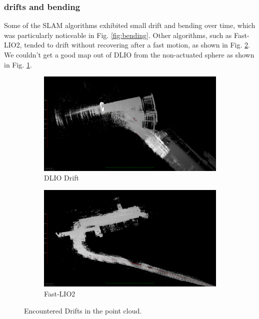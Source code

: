 \documentclass[conference]{IEEEtran}
\begin{document}
\subsubsection{drifts and bending}
Some of the SLAM algorithms exhibited small drift and bending over time, which was particularly noticeable in Fig. \ref{fig:bending}. Other algorithms, such as Fast-LIO2, tended to drift without recovering after a fast motion, as shown in Fig. \ref{fig:lio_drift}. We couldn't get a good map out of DLIO from the non-actuated sphere as shown in Fig. \ref{fig:dlio_drift}.
\begin{figure}
\centering
\begin{subfigure}{0.42\columnwidth}
    \centering
    \includegraphics[width=\textwidth]{pics/drifts_bending/dlio_drift.png}
    \caption{DLIO Drift}\label{fig:dlio_drift}
    \end{subfigure}
\hfill
\begin{subfigure}{0.41\columnwidth}
    \centering
    \includegraphics[width=\textwidth]{pics/drifts_bending/lio_drifts.png}
    \caption{Fast-LIO2}\label{fig:lio_drift}
\end{subfigure}
\hfill
\caption{Encountered Drifts in the point cloud.}
\label{fig:drift}
\end{figure}
\end{document}
